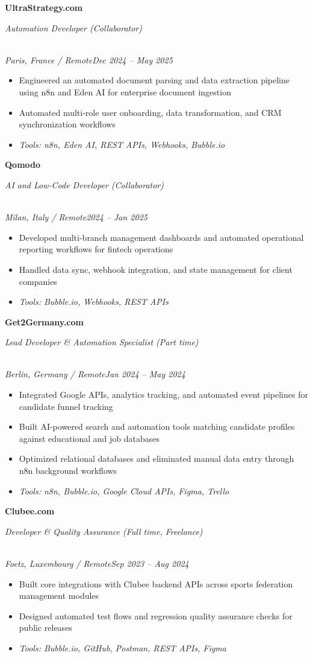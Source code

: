 \documentclass[a4paper,10pt]{article}
\newcommand{\role}[4]{\vspace{2pt}\noindent\hspace{0.6em}\parbox[t]{0.38\textwidth}{\raggedright\textbf{#1}}\hfill\parbox[t]{0.58\textwidth}{\raggedleft\textit{#2}}\\{\textit{#3}\hfill\textit{#4}}\vspace{1pt}}
\begin{document}
\role{UltraStrategy.com}{Automation Developer (Collaborator)}{Paris, France / Remote}{Dec 2024 -- May 2025}
\begin{itemize}
\item Engineered an automated document parsing and data extraction pipeline using n8n and Eden AI for enterprise document ingestion
\item Automated multi-role user onboarding, data transformation, and CRM synchronization workflows
\item \textit{Tools: n8n, Eden AI, REST APIs, Webhooks, Bubble.io}
\end{itemize}

\role{Qomodo}{AI and Low-Code Developer (Collaborator)}{Milan, Italy / Remote}{2024 -- Jan 2025}
\begin{itemize}
\item Developed multi-branch management dashboards and automated operational reporting workflows for fintech operations
\item Handled data sync, webhook integration, and state management for client companies
\item \textit{Tools: Bubble.io, Webhooks, REST APIs}
\end{itemize}

\role{Get2Germany.com}{Lead Developer \& Automation Specialist (Part time)}{Berlin, Germany / Remote}{Jan 2024 -- May 2024}
\begin{itemize}
\item Integrated Google APIs, analytics tracking, and automated event pipelines for candidate funnel tracking
\item Built AI-powered search and automation tools matching candidate profiles against educational and job databases
\item Optimized relational databases and eliminated manual data entry through n8n background workflows
\item \textit{Tools: n8n, Bubble.io, Google Cloud APIs, Figma, Trello}
\end{itemize}

\role{Clubee.com}{Developer \& Quality Assurance (Full time, Freelance)}{Foetz, Luxembourg / Remote}{Sep 2023 -- Aug 2024}
\begin{itemize}
\item Built core integrations with Clubee backend APIs across sports federation management modules
\item Designed automated test flows and regression quality assurance checks for public releases
\item \textit{Tools: Bubble.io, GitHub, Postman, REST APIs, Figma}
\end{itemize}
\end{document}
